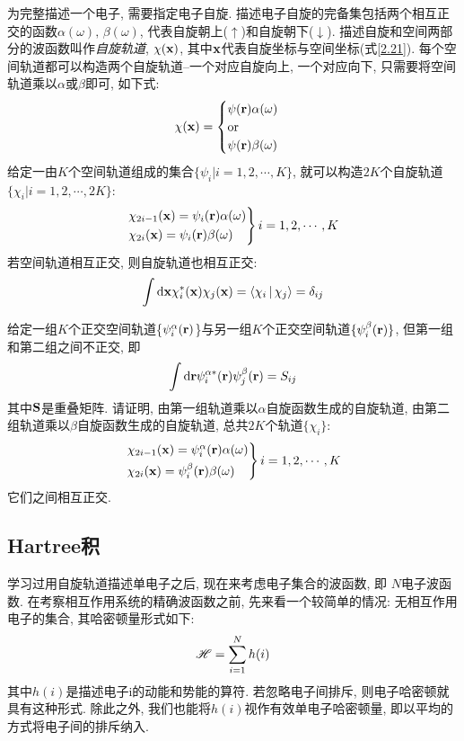 为完整描述一个电子, 
需要指定电子自旋. 
描述电子自旋的完备集包括两个相互正交的函数$\alpha(\omega),\,\beta(\omega)$, 
代表自旋朝上($\uparrow$)和自旋朝下($\downarrow$). 
描述自旋和空间两部分的波函数叫作\emph{自旋轨道},
$\chi(\mathbf{x})$,
其中$\mathbf{x}$代表自旋坐标与空间坐标(式\ref{2.21}). 
每个空间轨道都可以构造两个自旋轨道--一个对应自旋向上,
一个对应向下, 
只需要将空间轨道乘以$\alpha$或$\beta$即可, 
如下式:
\begin{equation}
	\chi(\mathbf{x})=
	\begin{cases}
	\psi(\mathbf{r})\alpha(\omega)\\
	\text{or}\\
	\psi(\mathbf{r})\beta(\omega)
	\end{cases}
\end{equation}
给定一由$K$个空间轨道组成的集合$\{\psi_i|i=1,2,\cdots,K \}$, 
就可以构造$2K$个自旋轨道$\{\chi_i|i=1,2,\cdots, 2K\}$:
\begin{equation}
\begin{rcases}
	\chi_{2i-1}(\mathbf{x})=\psi_i(\mathbf{r})\alpha(\omega)\\
	\chi_{2i}(\mathbf{x})=\psi_i(\mathbf{r})\beta(\omega)
\end{rcases}
i=1,2,\cdots,K
\end{equation}
若空间轨道相互正交, 
则自旋轨道也相互正交:
\begin{equation}
\int\dd\bo{x}\chi_i^*(\bo{x})\chi_j(\bo{x})=\braket{\chi_i|\chi_j}=\delta_{ij}
\end{equation}
\begin{xercise}
给定一组$K$个正交空间轨道\{$\psi_i^\alpha(\mathbf{r})$\}与另一组$K$个正交空间轨道$\{\psi_i^\beta(\mathbf{r})\}$, 
但第一组和第二组之间不正交, 
即
\[
\int\dd\bo{r}\psi_i^{\alpha*}(\bo{r})\psi_j^\beta(\bo{r})=S_{ij}
\]
其中$\mathbf{S}$是重叠矩阵. 
请证明, 
由第一组轨道乘以$\alpha$自旋函数生成的自旋轨道, 
由第二组轨道乘以$\beta$自旋函数生成的自旋轨道, 
总共$2K$个轨道$\{\chi_i \}$:
\begin{equation*}
\begin{rcases}
\chi_{2i-1}(\mathbf{x})=\psi_i^\alpha(\mathbf{r})\alpha(\omega)\\
\chi_{2i}(\mathbf{x})=\psi_i^\beta(\mathbf{r})\beta(\omega)
\end{rcases}
i=1,2,\cdots,K
\end{equation*}
它们之间相互正交.

\end{xercise}
\subsection{Hartree积}
 \label{sec2.2.2}
学习过用自旋轨道描述单电子之后, 
现在来考虑电子集合的波函数, 
即 $N$电子波函数. 
在考察相互作用系统的精确波函数之前, 
先来看一个较简单的情况: 无相互作用电子的集合, 
其哈密顿量形式如下:
\begin{equation}
\label{2.28}
\mathscr{H}=\sum_{i=1}^{N}h(i)
\end{equation}
其中$h(i)$是描述电子i的动能和势能的算符. 
若忽略电子间排斥, 
则电子哈密顿就具有这种形式. 
除此之外, 
我们也能将$h(i)$视作有效单电子哈密顿量, 
即以平均的方式将电子间的排斥纳入.


